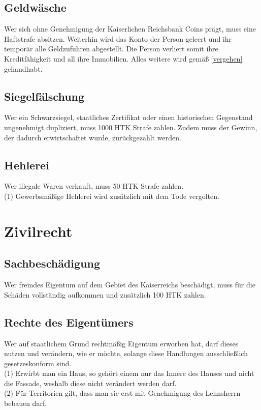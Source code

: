 \documentclass{article}
\begin{document}
\subsection{Geldwäsche}
Wer sich ohne Genehmigung der Kaiserlichen Reichsbank Coins prägt, muss eine Haftstrafe absitzen. Weiterhin wird das Konto der Person geleert und ihr temporär alle Geldzufuhren abgestellt. Die Person verliert somit ihre Kreditfähigkeit und all ihre Immobilien. Alles weitere wird gemäß \ref{vergehen} gehandhabt.

\subsection{Siegelfälschung}
Wer ein Schwarzsiegel, staatliches Zertifikat oder einen historischen Gegenstand ungenehmigt dupliziert, muss 1000 HTK Strafe zahlen. Zudem muss der Gewinn, der dadurch erwirtschaftet wurde, zurückgezahlt werden.

\subsection{Hehlerei}
Wer illegale Waren verkauft, muss 50 HTK Strafe zahlen.\\
(1) Gewerbsmäßige Hehlerei wird zusätzlich mit dem Tode vergolten.

\section{Zivilrecht}
\subsection{Sachbeschädigung}
Wer fremdes Eigentum auf dem Gebiet des Kaiserreichs beschädigt, muss für die Schäden vollständig aufkommen und zusätzlich 100 HTK zahlen.

\subsection{Rechte des Eigentümers}
Wer auf staatlichem Grund rechtmäßig Eigentum erworben hat, darf dieses nutzen und verändern, wie er möchte, solange diese Handlungen ausschließlich gesetzeskonform sind.\\
(1) Erwirbt man ein Haus, so gehört einem nur das Innere des Hauses und nicht die Fassade, weshalb diese nicht verändert werden darf.\\
(2) Für Territorien gilt, dass man sie erst mit Genehmigung des Lehnsherrn bebauen darf.
\end{document}
